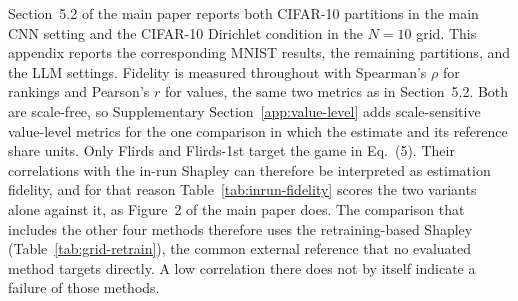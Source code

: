 \documentclass[letterpaper]{article} %
\theoremstyle{plain}
\begin{document}
Section~5.2 of the main paper reports both CIFAR-10 partitions in the main CNN
setting and the CIFAR-10 Dirichlet condition in the $N{=}10$ grid. This
appendix reports the corresponding MNIST results, the remaining partitions,
and the LLM settings. Fidelity is measured throughout with Spearman's $\rho$
for rankings and Pearson's $r$ for values, the same two metrics as in
Section~5.2. Both are scale-free, so Supplementary
Section~\ref{app:value-level} adds scale-sensitive value-level metrics for the
one comparison in which the estimate and its reference share units.
Only Flirds and Flirds-1st target the game in Eq.~(5). Their
correlations with the in-run Shapley can therefore be interpreted as
estimation fidelity, and for that reason Table~\ref{tab:inrun-fidelity}
scores the two variants alone against it, as Figure~2 of the main paper does.
The comparison that includes the other four methods therefore uses the
retraining-based Shapley (Table~\ref{tab:grid-retrain}), the common external
reference that no evaluated method targets directly. A low correlation there
does not by itself indicate a failure of those methods.
\end{document}
